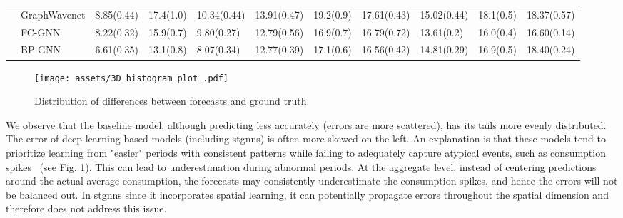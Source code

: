 \begin{table*}[htbp]
{\begin{tabular}{cllllllllll}
& GraphWavenet   & 8.85(0.44) & 17.4(1.0) & 10.34(0.44) & 13.91(0.47) & 19.2(0.9) & 17.61(0.43) & 15.02(0.44) & 18.1(0.5) & 18.37(0.57) \\   
& FC-GNN                             & 8.22(0.32) & 15.9(0.7) & 9.80(0.27) & 12.79(0.56) & 16.9(0.7) & 16.79(0.72) & 13.61(0.2) & 16.0(0.4) & 16.60(0.14) \\
& BP-GNN                                   & 6.61(0.35) & 13.1(0.8) & 8.07(0.34) & 12.77(0.39) & 17.1(0.6) & 16.56(0.42) & 14.81(0.29) & 16.9(0.5) & 18.40(0.24) \\
\hline
\hline
\end{tabular}
}
\endgroup
\label{tab:result_agg_228}
\end{table*}



\begin{figure}[h!]
    \centering
    \texttt{[image: assets/3D\_histogram\_plot\_.pdf]}
    \caption{Distribution of differences between forecasts and ground truth.}
    \label{fig:multiple-forecast}
\end{figure}


We observe that the baseline model, although predicting less accurately (errors are more scattered), has its tails more evenly distributed. The error of deep learning-based models (including \glspl{stgnn}) is often more skewed on the left. An explanation is that these models tend to prioritize learning from "easier" periods with consistent patterns while failing to adequately capture atypical events, such as consumption spikes~\cite{zhang_unlocking_2023} (see Fig. \ref{fig:multiple-forecast}). This can lead to underestimation during abnormal periods. At the aggregate level, instead of centering predictions around the actual average consumption, the forecasts may consistently underestimate the consumption spikes, and hence the errors will not be balanced out. In \glspl{stgnn} since it incorporates spatial learning, it can potentially propagate errors throughout the spatial dimension and therefore does not address this issue.




